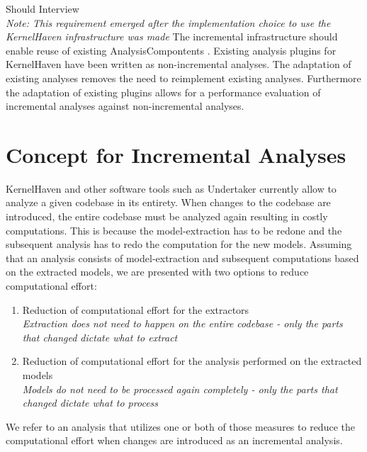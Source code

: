 \documentclass[a4paper]{article}
\begin{document}
\begin{req} \label{req:existing-analyses}
\reqtable
    {Should}  {Interview \\ \emph{Note: This requirement emerged after the implementation choice to use the KernelHaven infrastructure was made}}
	{The incremental infrastructure should enable reuse of existing AnalysisCompontents .}
	{Existing analysis plugins for KernelHaven have been written as non-incremental analyses. The adaptation of existing analyses removes the need to reimplement existing analyses. Furthermore the adaptation of existing plugins allows for a performance evaluation of incremental analyses against non-incremental analyses.}
\end{req}

\newpage

\section{Concept for Incremental Analyses}\label{concept}

KernelHaven and other software tools such as Undertaker\cite{Tartler:2011:FCC:1966445.1966451} currently allow to analyze a given codebase in its entirety. When changes to the codebase are introduced, the entire codebase must be analyzed again resulting in costly computations. This is because the model-extraction has to be redone and the subsequent analysis has to redo the computation for the new models. Assuming that an analysis consists of model-extraction and subsequent computations based on the extracted models, we are presented with two options to reduce computational effort:

\begin{enumerate}
	\item Reduction of computational effort for the extractors \\
	\emph{Extraction does not need to happen on the entire codebase - only the parts that changed dictate what to extract}
	\item Reduction of computational effort for the analysis performed on the extracted models \\
	\emph{Models do not need to be processed again completely - only the parts that changed dictate what to process}
\end{enumerate}

We refer to an analysis that utilizes one or both of those measures to reduce the computational effort when changes are introduced as an incremental analysis.
\end{document}
